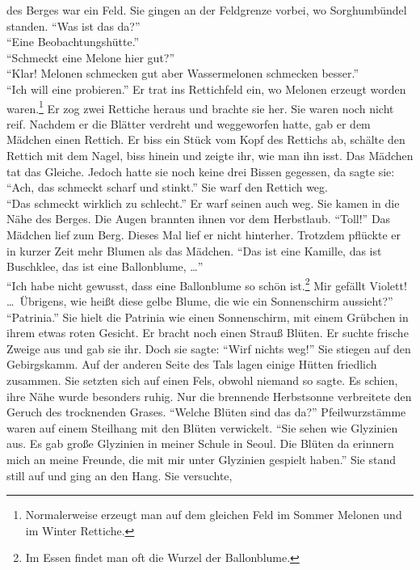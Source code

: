 \documentclass[prd,12pt,tightenlines,notitlepage,nofootinbib]{revtex4-1}
\begin{document}
des Berges war ein Feld.  Sie gingen an der Feldgrenze vorbei, wo
Sorghumbündel standen.  "`Was ist das da?"'\\
"`Eine Beobachtungshütte."'\\
"`Schmeckt eine Melone hier gut?"'\\
"`Klar!  Melonen schmecken gut aber Wassermelonen schmecken besser."'\\
"`Ich will eine probieren."'  Er
trat ins Rettichfeld ein, wo Melonen erzeugt worden waren.\footnote{
Normalerweise erzeugt man auf dem gleichen Feld
im Sommer Melonen und im Winter Rettiche.}
Er zog
zwei Rettiche heraus und brachte sie her.  Sie waren noch nicht reif.
Nachdem er die Blätter verdreht und weggeworfen hatte, gab er dem Mädchen einen
Rettich.  Er biss ein Stück vom Kopf des Rettichs ab, schälte den
Rettich mit dem Nagel, biss hinein und zeigte ihr, wie man ihn
isst.  Das Mädchen tat das Gleiche.  Jedoch hatte sie noch keine drei
Bissen gegessen, da sagte sie: "`Ach, das schmeckt scharf und stinkt."'  Sie warf den
Rettich weg.
\\ "`Das schmeckt wirklich zu schlecht."'  Er warf seinen auch
weg.  Sie kamen in die Nähe des Berges.  Die Augen brannten ihnen vor dem Herbstlaub.
"`Toll!"'  Das Mädchen lief zum Berg.  Dieses Mal lief er nicht hinterher.
Trotzdem pflückte er in kurzer Zeit mehr Blumen als das Mädchen.
"`Das ist eine Kamille, das ist Buschklee, das ist eine Ballonblume, \ldots"'
\\ "`Ich habe nicht gewusst, dass eine Ballonblume so schön ist.\footnote{
Im Essen findet man oft die Wurzel der Ballonblume.}
Mir gefällt
Violett!  \ldots\  Übrigens, wie heißt diese gelbe Blume, die wie ein
Sonnenschirm aussieht?"'\\
"`Patrinia."'  Sie hielt die Patrinia wie einen
Sonnenschirm, mit einem Grübchen in ihrem etwas roten Gesicht.  Er
bracht noch einen Strauß Blüten.  Er suchte frische Zweige aus und
gab sie ihr.  Doch sie sagte: "`Wirf nichts weg!"'  Sie stiegen auf den
Gebirgskamm.  Auf der anderen Seite des Tals lagen einige Hütten
friedlich zusammen.  Sie setzten sich auf einen Fels, obwohl niemand
so sagte.  Es schien, ihre Nähe wurde besonders ruhig.  Nur die
brennende Herbstsonne verbreitete den Geruch des trocknenden Grases.
"`Welche Blüten sind das da?"'  Pfeilwurzstämme waren auf einem
Steilhang mit den Blüten verwickelt.  "`Sie sehen wie Glyzinien aus.
Es gab große Glyzinien in meiner Schule in Seoul.  Die Blüten da
erinnern mich an meine Freunde, die mit mir unter Glyzinien gespielt
haben."'  Sie stand still auf und ging an den Hang.  Sie versuchte,
\end{document}
